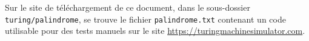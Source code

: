 Sur le site de téléchargement de ce document, dans le sous-dossier \verb+turing/palindrome+, se trouve le fichier \verb+palindrome.txt+ contenant un code utilisable pour des tests manuels sur le site \url{https://turingmachinesimulator.com}.